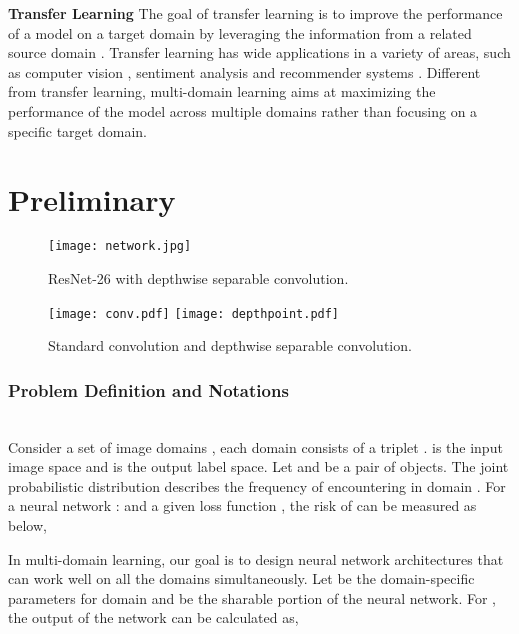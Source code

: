 \documentclass[letterpaper]{article} \usepackage{aaai19}  \usepackage{times}  \usepackage{helvet}  \usepackage{courier}  \usepackage{url}  \usepackage{graphicx}  \usepackage{amssymb}
\begin{document}
\noindent\textbf{Transfer Learning} The goal of transfer learning is to improve the performance of a model on a target domain by leveraging the information from a related source domain \cite{pan2010survey,bengio2012deep,hu2015deep}. Transfer learning has wide applications in a variety of areas, such as computer vision \cite{raina2007self}, sentiment analysis \cite{glorot2011domain} and recommender systems 
\cite{pan2010transfer,guo2015crorank}. Different from transfer learning, multi-domain learning aims at maximizing the performance of the model across multiple domains rather than focusing on a specific target domain.
\\



\section{Preliminary}
 \begin{figure*}[t]
\centering
\texttt{[image: network.jpg]}
\caption{ResNet-26 with depthwise separable convolution.}
\label{fig: arch}
\end{figure*}

\begin{figure}[h]
\centering
     \texttt{[image: conv.pdf]}
     \hfil
     \texttt{[image: depthpoint.pdf]}
\caption{Standard convolution and depthwise separable convolution.}   \label{fig: convs}
\end{figure}

\subsubsection{Problem Definition and Notations} ~\\
\noindent Consider a set of image domains , each domain  consists of a triplet .  is the input image space and  is the output label space. Let  and  be a pair of objects. The joint probabilistic distribution  describes the frequency of encountering  in domain . For a neural network :  and a given loss function , the risk of  can be measured as below,



In multi-domain learning, our goal is to design neural network architectures that can work well on all the domains simultaneously. Let  be the domain-specific parameters for domain  and  be the sharable portion of the neural network. For , the output of the network can be calculated as,
\end{document}
